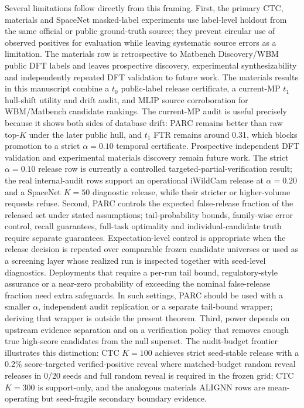 \documentclass[10pt,twocolumn]{article}
\begin{document}
Several limitations follow directly from this framing.
First, the primary CTC, materials and SpaceNet masked-label experiments use label-level holdout from the same official or public ground-truth source; they prevent circular use of observed positives for evaluation while leaving systematic source errors as a limitation.
The materials row is retrospective to Matbench Discovery/WBM public DFT labels and leaves prospective discovery, experimental synthesizability and independently repeated DFT validation to future work.
The materials results in this manuscript combine a \(t_0\) public-label release certificate, a current-MP \(t_1\) hull-shift utility and drift audit, and MLIP source corroboration for WBM/Matbench candidate rankings.
The current-MP audit is useful precisely because it shows both sides of database drift: PARC remains better than raw top-\(K\) under the later public hull, and \(t_1\) FTR remains around 0.31, which blocks promotion to a strict \(\alpha=0.10\) temporal certificate.
Prospective independent DFT validation and experimental materials discovery remain future work.
The strict \(\alpha=0.10\) release row is currently a controlled targeted-partial-verification result; the real internal-audit rows support an operational iWildCam release at \(\alpha=0.20\) and a SpaceNet \(K=50\) diagnostic release, while their stricter or higher-volume requests refuse.
Second, PARC controls the expected false-release fraction of the released set under stated assumptions; tail-probability bounds, family-wise error control, recall guarantees, full-task optimality and individual-candidate truth require separate guarantees.
Expectation-level control is appropriate when the release decision is repeated over comparable frozen candidate universes or used as a screening layer whose realized run is inspected together with seed-level diagnostics.
Deployments that require a per-run tail bound, regulatory-style assurance or a near-zero probability of exceeding the nominal false-release fraction need extra safeguards.
In such settings, PARC should be used with a smaller \(\alpha\), independent audit replication or a separate tail-bound wrapper; deriving that wrapper is outside the present theorem.
Third, power depends on upstream evidence separation and on a verification policy that removes enough true high-score candidates from the null superset.
The audit-budget frontier illustrates this distinction: CTC \(K=100\) achieves strict seed-stable release with a 0.2\% score-targeted verified-positive reveal where matched-budget random reveal releases in 0/20 seeds and full random reveal is required in the frozen grid; CTC \(K=300\) is support-only, and the analogous materials ALIGNN rows are mean-operating but seed-fragile secondary boundary evidence.
\end{document}
